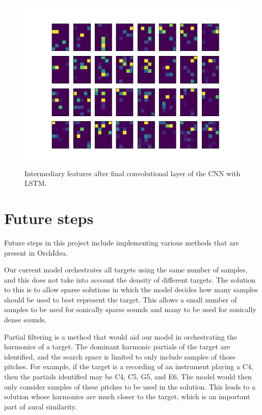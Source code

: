 \documentclass{article}
\begin{document}
\begin{figure}
\includegraphics[scale=0.5]{figs/latent_space_layer5.png}
\caption{Intermediary features after final convolutional layer of the CNN with LSTM. \label{latent5}}
\end{figure}

\section{Future steps}

Future steps in this project include implementing various methods that are present in OrchIdea.

Our current model orchestrates all targets using the same number of samples, and this does not take into account the density of different targets. The solution to this is to allow sparse solutions in which the model decides how many samples should be used to best represent the target. This allows a small number of samples to be used for sonically sparse sounds and many to be used for sonically dense sounds.

Partial filtering is a method that would aid our model in orchestrating the harmonics of a target. The dominant harmonic partials of the target are identified, and the search space is limited to only include samples of those pitches. For example, if the target is a recording of an instrument playing a C4, then the partials identified may be C4, C5, G5, and E6. The model would then only consider samples of these pitches to be used in the solution. This leads to a solution whose harmonics are much closer to the target, which is an important part of aural similarity.
\end{document}
